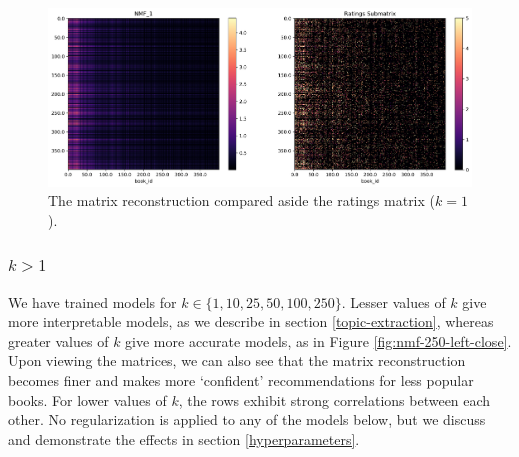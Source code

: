 \documentclass[11pt]{article}
\begin{document}
\begin{figure}
    \includegraphics[width=\linewidth]{../image/goodreads-models/nmf-1-left.png}
    \caption[NMF-1]{The matrix reconstruction compared aside the ratings matrix ($k=1$).}
     \label{fig:nmf-1}
\end{figure}









    \hypertarget{k>1}{%
\subsubsection{\texorpdfstring{\(k > 1\)}{k > 1}}\label{k>1}}

%

We have trained models for $k \in \{1, 10, 25, 50, 100, 250\}$. Lesser values of \(k\) give more
interpretable models, as we describe in section \ref{topic-extraction}, whereas greater values of \(k\) give more accurate
models, as in Figure \ref{fig:nmf-250-left-close}.
Upon viewing the matrices, we can also see that the matrix reconstruction becomes
finer and makes more `confident' recommendations for less popular books.
For lower values of $k$, the rows exhibit strong correlations between each other.
No regularization is applied to any of the models below, but we discuss and demonstrate the effects in section \ref{hyperparameters}.
\end{document}

